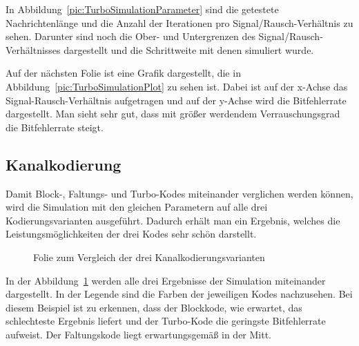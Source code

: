 In Abbildung~\ref{pic:TurboSimulationParameter} sind die getestete Nachrichtenlänge und die Anzahl der Iterationen pro Signal/Rausch-Verhältnis zu sehen. Darunter sind noch die Ober- und Untergrenzen des Signal/Rausch-Verhältnisses dargestellt und die Schrittweite mit denen simuliert wurde.

Auf der nächsten Folie ist eine Grafik dargestellt, die in Abbildung~\ref{pic:TurboSimulationPlot} zu sehen ist. Dabei ist auf der x-Achse das Signal-Rausch-Verhältnis aufgetragen und auf der y-Achse wird die Bitfehlerrate dargestellt. Man sieht sehr gut, dass mit größer werdendem Verrauschungsgrad die Bitfehlerrate steigt.

\FloatBarrier
\subsection{Kanalkodierung}
\label{sec:visualization_simulations_channelcoding}
Damit Block-, Faltungs- und Turbo-Kodes miteinander verglichen werden können, wird die Simulation mit den gleichen Parametern auf alle drei Kodierungsvarianten ausgeführt. Dadurch erhält man ein Ergebnis, welches die Leistungsmöglichkeiten der drei Kodes sehr schön darstellt.

\begin{figure}[th]
\centering
{}
\caption{Folie zum Vergleich der drei Kanalkodierungsvarianten}
\label{pic:ChannelcodingSimulation}
\end{figure}

In der Abbildung~\ref{pic:ChannelcodingSimulation} werden alle drei Ergebnisse der Simulation miteinander dargestellt. In der Legende sind die Farben der jeweiligen Kodes nachzusehen. Bei diesem Beispiel ist zu erkennen, dass der Blockkode, wie erwartet, das schlechteste Ergebnis liefert und der Turbo-Kode die geringste Bitfehlerrate aufweist. Der Faltungskode liegt erwartungsgemäß in der Mitt.

